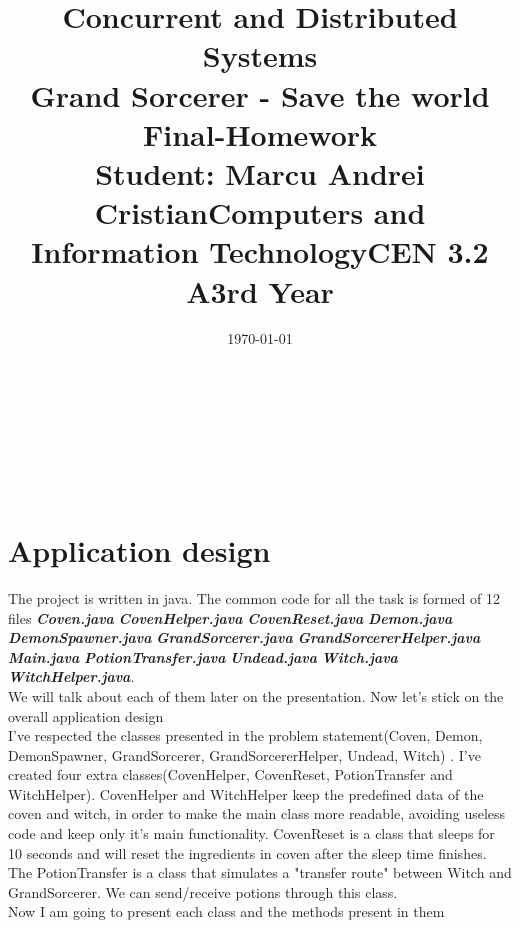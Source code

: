 \documentclass[14pt]{article}
\begin{document}
\title{%
  \huge Concurrent and Distributed Systems \\
  \vspace {10mm}
  \huge Grand Sorcerer - Save the world \\
  \vspace{20mm}
  \large Final-Homework \\}

\date{\today}
\maketitle
\begin{center}
\vspace{30 mm}

\title{\huge Student: Marcu Andrei Cristian}
\\\vspace{10 mm}
\title{\huge Computers and Information Technology}
\\\vspace{10 mm}
\title{\huge CEN 3.2 A}
\\\vspace{10 mm}
\title{\huge 3rd Year}
\end{center}
\date{}
\maketitle

\newpage
\section*{Application design}
\vspace{10 mm}
The project is written in java. The common code for all the task is formed of 12 files \textbf{\textit{Coven.java}} \textbf{\textit{CovenHelper.java}}            \textbf{\textit{CovenReset.java}}   \textbf{\textit{Demon.java}}       \textbf{\textit{DemonSpawner.java}} \textbf{\textit{GrandSorcerer.java}} \textbf{\textit{GrandSorcererHelper.java}} \\ \textbf{\textit{Main.java}} \textbf{\textit{PotionTransfer.java}} \textbf{\textit{Undead.java}}
\textbf{\textit{Witch.java}} \textbf{\textit{WitchHelper.java}}.
\\We will talk about each of them later on the presentation. Now let's stick on the overall application design
\\I've respected the classes presented in the problem statement(Coven, Demon, DemonSpawner, GrandSorcerer, GrandSorcererHelper, Undead, Witch) . I've created four extra classes(CovenHelper, CovenReset, PotionTransfer and WitchHelper). CovenHelper and WitchHelper keep the predefined data of the coven and witch, in order to make the main class more readable, avoiding useless code and keep only it's main functionality. CovenReset is a class that sleeps for 10 seconds and will reset the ingredients in coven after the sleep time finishes. The PotionTransfer is a class that simulates a "transfer route" between Witch and GrandSorcerer. We can send/receive potions through this class.\\
Now I am going to present each class and the methods present in them
\\\vspace{10 mm}
\end{document}
